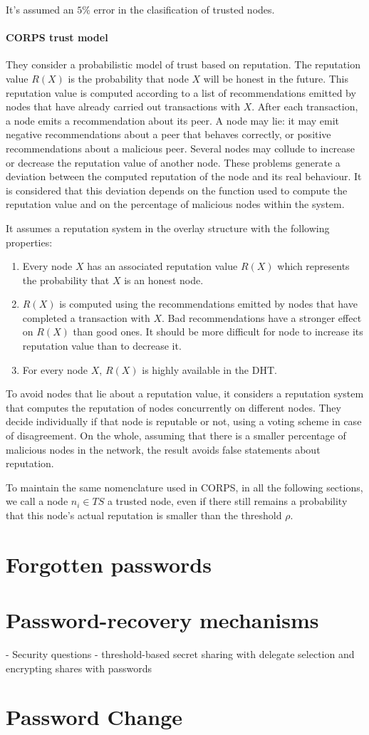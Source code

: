 It's assumed an $5\%$ error in the clasification of trusted nodes.


\paragraph{CORPS trust model}
They consider a probabilistic model of trust based on reputation.
The reputation value $R(X)$ is the probability that node $X$ will
be honest in the future. This reputation value is computed
according to a list of recommendations emitted by nodes that
have already carried out transactions with $X$.
After each transaction, a node emits a recommendation
about its peer. A node may lie: it may emit negative
recommendations about a peer that behaves correctly, or
positive recommendations about a malicious peer. Several nodes
may collude to increase or decrease the reputation value of
another node. These problems generate a deviation between
the computed reputation of the node and its real behaviour. It is
considered that this deviation depends on the function used to
compute the reputation value and on the percentage of malicious
nodes within the system.

It assumes a reputation system in the overlay structure with the following properties:
\begin{enumerate}
  \item Every node $X$ has an associated reputation value $R(X)$
  which represents the probability that $X$ is an honest node.
  \item $R(X)$ is computed using the recommendations emitted
  by nodes that have completed a transaction with $X$. Bad
  recommendations have a stronger effect on $R(X)$ than
  good ones. It should be more difficult for node to
  increase its reputation value than to decrease it.
  \item For every node $X$, $R(X)$ is highly available in the DHT.
\end{enumerate}

To avoid nodes that lie about a reputation value, it considers a reputation
system that computes the reputation of nodes concurrently on different nodes.
They decide individually if that node is reputable or not, using a voting
scheme in case of disagreement. On the whole, assuming that there is a smaller
percentage of malicious nodes in the network, the result avoids
false statements about reputation.

To maintain the same nomenclature used in CORPS, in all the following sections,
we call a node $n_i \in TS$ a trusted node, even if there still remains a
probability that this node's actual reputation is smaller than the threshold
$\rho$.
 
 
 


\section{Forgotten passwords}

\section{Password-recovery mechanisms}
  - Security questions
  - threshold-based secret sharing with delegate selection and encrypting
  shares with passwords

\section{Password Change}

